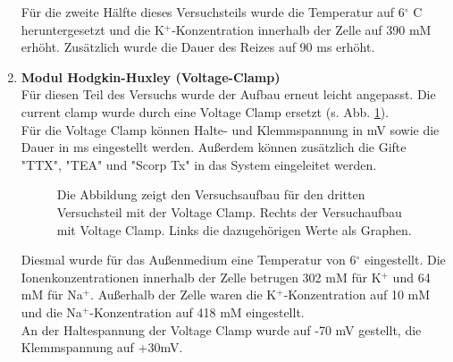 \documentclass[11pt]{article}
\begin{document}
\begin{enumerate}
Für die zweite Hälfte dieses Versuchsteils wurde die Temperatur auf 6$^\circ$ C heruntergesetzt und die K$^+$-Konzentration innerhalb der Zelle auf 390 mM erhöht. Zusätzlich wurde die Dauer des Reizes auf 90 ms erhöht.

\item \textbf{Modul Hodgkin-Huxley (Voltage-Clamp)}\\
Für diesen Teil des Versuchs wurde der Aufbau erneut leicht angepasst. Die current clamp wurde durch eine Voltage Clamp ersetzt (s. Abb. \ref{a3_aufbau}).\\
Für die Voltage Clamp können Halte- und Klemmspannung in mV sowie die Dauer in ms eingestellt werden. Außerdem können zusätzlich die Gifte "{}TTX"{}, "{}TEA"{} und "{}Scorp Tx"{} in das System eingeleitet werden.

\begin{figure}[H]
\caption{Die Abbildung zeigt den Versuchsaufbau für den dritten Versuchsteil mit der Voltage Clamp. Rechts der Versuchaufbau mit Voltage Clamp. Links die dazugehörigen Werte als Graphen.}
\label{a3_aufbau}
\end{figure}
Diesmal wurde für das Außenmedium eine Temperatur von 6$^\circ$ eingestellt. Die Ionenkonzentrationen innerhalb der Zelle betrugen 302 mM für K$^+$ und 64 mM für Na$^+$. Außerhalb der Zelle waren die K$^+$-Konzentration auf 10 mM und die Na$^+$-Konzentration auf 418 mM eingestellt.\\
An der Haltespannung der Voltage Clamp wurde auf -70 mV gestellt, die Klemmspannung auf +30mV.\\


\end{enumerate}
\end{document}
